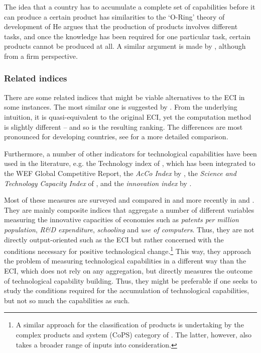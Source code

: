 \documentclass[abstract=on]{scrartcl}
\begin{document}
The idea that a country has to accumulate a complete set of capabilities before it can produce a certain product has similarities to the `O-Ring' theory of development of \citet{Kremer:1993cs} 
He argues that the production of products involves different tasks, and once the knowledge has been required for one particular task, certain products cannot be produced at all. 
A similar argument is made by \citet{Sutton:2012uka}, although from a firm perspective.

\subsubsection{Related indices}
There are some related indices that might be viable alternatives to the ECI in some instances.
The most similar one is suggested by \citet{Tacchella:2012fx, Tacchella:2013ko}.
From the underlying intuition, it is quasi-equivalent to the original ECI, yet the computation method is slightly different -- and so is the resulting ranking.
The differences are most pronounced for developing countries, see \citet{Cristelli:2013hj} for a more detailed comparison.

Furthermore, a number of other indicators for technological capabilities have been used in the literature, e.g.
the Technology index of \citet{Furman:2002gu}, which has been integrated to the WEF Global Competitive Report,  
the \textit{AcCo Index} by \citet{Archibugi:2004bp},
the \textit{Science and Technology Capacity Index} of \citet{Wagner:2001up}, and
the \textit{innovation index} by \citet{Khayyat:2015ks}.

Most of these measures are surveyed and compared in \citet{Archibugi:2005iu} and more recently in \citet{Archibugi:2009bf} and \citet{Felipe:2012fv}.
They are mainly composite indices that aggregate a number of different variables measuring the innovative capacities of economies such as \textit{patents per million population}, \textit{R\&D expenditure}, \textit{schooling} and \textit{use of computers}.
Thus, they are not directly output-oriented such as the ECI but rather concerned with the conditions necessary for positive technological change.\footnote{A similar approach for the classification of products is undertaking by the complex products and system (CoPS) category of \citet{Hobday:2000hx}. The latter, however, also takes a broader range of inputs into consideration.}
This way, they approach the problem of measuring technological capabilities in a different way than the ECI, which does not rely on any aggregation, but directly measures the outcome of technological capability building.
Thus, they might be preferable if one seeks to study the conditions required for the accumulation of technological capabilities, but not so much the capabilities as such.
\end{document}

